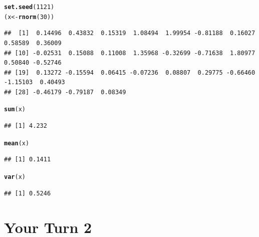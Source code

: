 \documentclass{article}\usepackage[]{graphicx}\usepackage[]{color}
\makeatletter
\newcommand{\hlnum}[1]{\textcolor[rgb]{0.686,0.059,0.569}{#1}}%
\newcommand{\hlstd}[1]{\textcolor[rgb]{0.345,0.345,0.345}{#1}}%
\newcommand{\hlkwb}[1]{\textcolor[rgb]{0.69,0.353,0.396}{#1}}%
\newcommand{\hlkwd}[1]{\textcolor[rgb]{0.737,0.353,0.396}{\textbf{#1}}}%
\newenvironment{kframe}{%
 \def\at@end@of@kframe{}%
 \ifinner\ifhmode%
  \def\at@end@of@kframe{\end{minipage}}%
  \begin{minipage}{\columnwidth}%
 \fi\fi%
 \def\FrameCommand##1{\hskip\@totalleftmargin \hskip-\fboxsep
 \colorbox{shadecolor}{##1}\hskip-\fboxsep
     \hskip-\linewidth \hskip-\@totalleftmargin \hskip\columnwidth}%
 \MakeFramed {\advance\hsize-\width
   \@totalleftmargin\z@ \linewidth\hsize
   \@setminipage}}%
 {\par\unskip\endMakeFramed%
 \at@end@of@kframe}
\newenvironment{knitrout}{}{} %
\makeatother
\begin{document}
\begin{knitrout}
\color{fgcolor}\begin{kframe}
\begin{alltt}
\hlkwd{set.seed}\hlstd{(}\hlnum{1121}\hlstd{)}
\hlstd{(x} \hlkwb{<-} \hlkwd{rnorm}\hlstd{(}\hlnum{30}\hlstd{))}
\end{alltt}
\begin{verbatim}
##  [1]  0.14496  0.43832  0.15319  1.08494  1.99954 -0.81188  0.16027  0.58589  0.36009
## [10] -0.02531  0.15088  0.11008  1.35968 -0.32699 -0.71638  1.80977  0.50840 -0.52746
## [19]  0.13272 -0.15594  0.06415 -0.07236  0.08807  0.29775 -0.66460 -1.15103  0.40493
## [28] -0.46179 -0.79187  0.08349
\end{verbatim}
\begin{alltt}
\hlkwd{sum}\hlstd{(x)}
\end{alltt}
\begin{verbatim}
## [1] 4.232
\end{verbatim}
\begin{alltt}
\hlkwd{mean}\hlstd{(x)}
\end{alltt}
\begin{verbatim}
## [1] 0.1411
\end{verbatim}
\begin{alltt}
\hlkwd{var}\hlstd{(x)}
\end{alltt}
\begin{verbatim}
## [1] 0.5246
\end{verbatim}
\end{kframe}
\end{knitrout}

\clearpage
\section{Your Turn 2}
\end{document}
